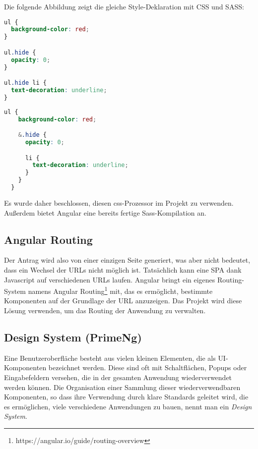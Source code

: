 Die folgende Abbildung zeigt die gleiche Style-Deklaration mit CSS und SASS:\\

\begin{lstlisting}[language=css,caption={Beispiel für die Gestaltung einer Liste mit css},captionpos=b]
ul {
  background-color: red;
}

ul.hide {
  opacity: 0;
}

ul.hide li {
  text-decoration: underline;
}
\end{lstlisting}

\begin{lstlisting}[language=css,caption={Beispiel für die Gestaltung einer Liste mit scss},captionpos=b]
  ul {
    background-color: red;

    &.hide {
      opacity: 0;

      li {
        text-decoration: underline;
      }
    }
  }
\end{lstlisting}


Es wurde daher beschlossen, diesen css-Prozessor im Projekt zu verwenden. Außerdem bietet Angular eine bereits fertige Sass-Kompilation an.

\subsection{Angular Routing}

Der Antrag wird also von einer einzigen Seite generiert, was aber nicht bedeutet, dass ein Wechsel der URLs nicht möglich ist.
Tatsächlich kann eine SPA dank Javascript auf verschiedenen URLs laufen.
Angular bringt ein eigenes Routing-System namens Angular Routing\footnote{https://angular.io/guide/routing-overview} mit, das es ermöglicht, bestimmte Komponenten auf der Grundlage der URL anzuzeigen. Das Projekt wird diese Lösung verwenden, um das Routing der Anwendung zu verwalten.

\subsection{Design System (PrimeNg)}

Eine Benutzeroberfläche besteht aus vielen kleinen Elementen, die als \ac{UI}-Komponenten bezeichnet werden.
Diese sind oft mit Schaltflächen, Popups oder Eingabefeldern versehen, die in der gesamten Anwendung wiederverwendet werden können.
Die Organisation einer Sammlung dieser wiederverwendbaren Komponenten, so dass ihre Verwendung durch klare Standards geleitet wird, die es ermöglichen, viele verschiedene Anwendungen zu bauen, nennt man ein \textit{Design System}\cite{guideToDesignSystems}.

